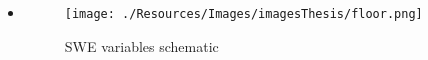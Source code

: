 \begin{frame}
\vspace{-2mm}

\begin{columns}

\begin{column}{0.4\textwidth}  %
\begin{itemize}[leftmargin=*]
\item<1->[]
\vspace{2cm}
\begin{center}
\begin{figure}
\texttt{[image: ./Resources/Images/imagesThesis/floor.png]}%
\caption{SWE variables schematic}
\label{fig:swechemedit}
\end{figure}
\end{center}
\end{itemize}
\end{column}


\end{columns}
\end{frame}
